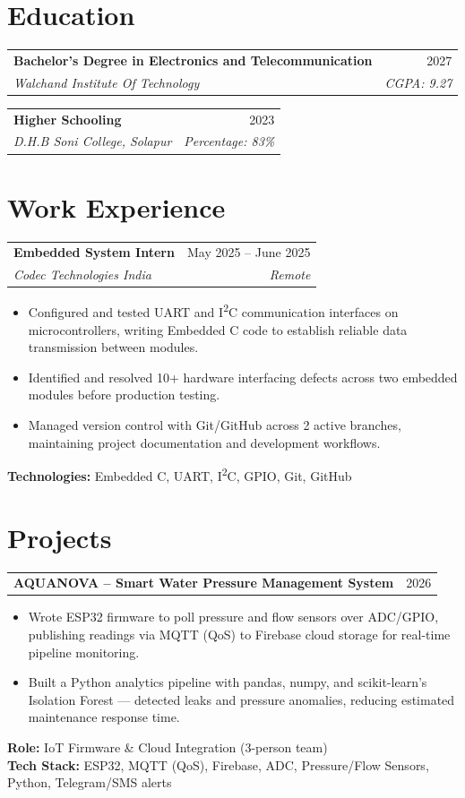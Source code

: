 \documentclass[letterpaper,10pt]{article}
\makeatletter
\newcommand{\resumeItemListStart}{\begin{itemize}[leftmargin=0.18in, topsep=1.5pt, parsep=0pt, itemsep=1pt]}
\newcommand{\resumeItemListEnd}{\end{itemize}\vspace{-4pt}}
\newcommand{\resumeItem}[1]{\item\small{#1}}
\newcommand{\resumeSubheading}[4]{
  \vspace{-1pt}
  \begin{tabular*}{\textwidth}[t]{l@{\extracolsep{\fill}}r}
    \textbf{#1} & #2 \\
    \textit{\small#3} & \textit{\small #4} \\
  \end{tabular*}\vspace{-4pt}
}
\newcommand{\resumeProjectHeading}[2]{
  \vspace{-1pt}
  \begin{tabular*}{\textwidth}[t]{l@{\extracolsep{\fill}}r}
    \textbf{#1} & #2 \\
  \end{tabular*}\vspace{-4pt}
}
\makeatother
\begin{document}
\vspace{-6pt}

\section{Education}
\resumeSubheading
  {Bachelor's Degree in Electronics and Telecommunication}{2027}
  {Walchand Institute Of Technology}{CGPA: 9.27}
\resumeSubheading
  {Higher Schooling}{2023}
  {D.H.B Soni College, Solapur}{Percentage: 83\%}

\vspace{-2pt}

\section{Work Experience}
\resumeSubheading
  {Embedded System Intern}{May 2025 -- June 2025}
  {Codec Technologies India}{Remote}
\resumeItemListStart
  \resumeItem{Configured and tested UART and I\textsuperscript{2}C communication interfaces on microcontrollers, writing Embedded C code to establish reliable data transmission between modules.}
  \resumeItem{Identified and resolved 10+ hardware interfacing defects across two embedded modules before production testing.}
  \resumeItem{Managed version control with Git/GitHub across 2 active branches, maintaining project documentation and development workflows.}
\resumeItemListEnd
\small{\textbf{Technologies:} Embedded C, UART, I\textsuperscript{2}C, GPIO, Git, GitHub}

\vspace{-2pt}

\section{Projects}

\resumeProjectHeading
  {\textbf{AQUANOVA -- Smart Water Pressure Management System}}{2026}
\resumeItemListStart
  \resumeItem{Wrote ESP32 firmware to poll pressure and flow sensors over ADC/GPIO, publishing readings via MQTT (QoS) to Firebase cloud storage for real-time pipeline monitoring.}
  \resumeItem{Built a Python analytics pipeline with pandas, numpy, and scikit-learn's Isolation Forest --- detected leaks and pressure anomalies, reducing estimated maintenance response time.}
\resumeItemListEnd
\small{\textbf{Role:} IoT Firmware \& Cloud Integration (3-person team)} \\
\small{\textbf{Tech Stack:} ESP32, MQTT (QoS), Firebase, ADC, Pressure/Flow Sensors, Python, Telegram/SMS alerts}
\end{document}
